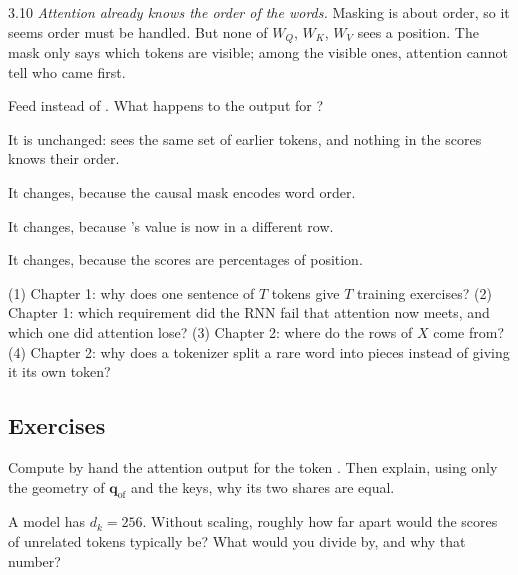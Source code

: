 \begin{wrongidea}{3.10}
\emph{Attention already knows the order of the words.} Masking is about order, so it seems order must be handled. But none of $W_Q$, $W_K$, $W_V$
sees a position. The mask only says which tokens are visible; among the visible ones, attention cannot tell who
came first.
\end{wrongidea}

\begin{checkq}
Feed  instead of . What happens to the output for ?
\begin{options}
\item It is unchanged:  sees the same set of earlier tokens, and nothing in the scores knows their order.
\item It changes, because the causal mask encodes word order.
\item It changes, because 's value is now in a different row.
\item It changes, because the scores are percentages of position.
\end{options}
\end{checkq}


\begin{lookingback}
(1) Chapter 1: why does one sentence of $T$ tokens give $T$ training exercises? (2) Chapter 1: which requirement did
the RNN fail that attention now meets, and which one did attention lose? (3) Chapter 2: where do the rows of $X$ come
from? (4) Chapter 2: why does a tokenizer split a rare word into pieces instead of giving it its own token?
\end{lookingback}

\subsection*{Exercises}

\begin{exercise}
Compute by hand the attention output for the token . Then explain, using only the geometry of
$\bm{q}_{\text{of}}$ and the keys, why its two shares are equal.
\end{exercise}

\begin{exercise}
A model has $d_k=256$. Without scaling, roughly how far apart would the scores of unrelated tokens typically be? What
would you divide by, and why that number?
\end{exercise}

